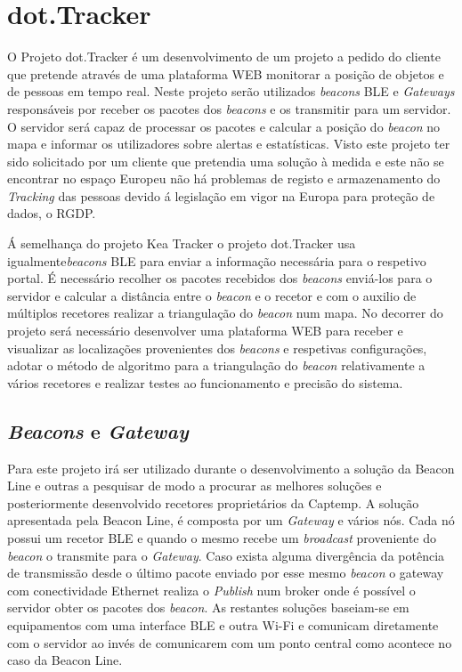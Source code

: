 \section{dot.Tracker} \label{dot.tracker}


\par O Projeto dot.Tracker é um desenvolvimento de um projeto a pedido do cliente que pretende através de uma plataforma WEB monitorar a posição de objetos e de pessoas em tempo real. Neste projeto serão utilizados \textit{beacons} BLE e \textit{Gateways} responsáveis por receber os pacotes dos \textit{beacons} e os transmitir para um servidor. O servidor será capaz de processar os pacotes e calcular a posição do \textit{beacon} no mapa e informar os utilizadores sobre alertas e estatísticas. Visto este projeto ter sido solicitado por um cliente que pretendia uma solução à medida e este não se encontrar no espaço Europeu não há problemas de registo e armazenamento do \textit{Tracking} das pessoas devido á legislação em vigor na Europa para proteção de dados, o RGDP.

Á semelhança do projeto Kea Tracker o projeto dot.Tracker usa igualmente\textit{beacons} BLE para enviar a informação necessária para o respetivo portal. É necessário recolher os pacotes recebidos dos \textit{beacons} enviá-los para o servidor e calcular a distância entre o \textit{beacon} e o recetor e com o auxilio de múltiplos recetores realizar a triangulação do \textit{beacon} num mapa. No decorrer do projeto será necessário desenvolver uma plataforma WEB para receber e visualizar as localizações provenientes dos \textit{beacons} e respetivas configurações, adotar o método de algoritmo para a triangulação do \textit{beacon} relativamente a vários recetores e realizar testes ao funcionamento e precisão do sistema.
\subsection{\textit{Beacons} e \textit{Gateway}}
Para este projeto irá ser utilizado durante o desenvolvimento a solução da Beacon Line\cite{taskit} e outras a pesquisar de modo a procurar as melhores soluções e posteriormente desenvolvido recetores proprietários da Captemp. A solução apresentada pela Beacon Line, é composta por um \textit{Gateway} e vários nós. Cada nó possui um recetor BLE e quando o mesmo recebe um \textit{broadcast} proveniente do \textit{beacon} o transmite para o \textit{Gateway}. Caso exista alguma divergência da potência de transmissão desde o último pacote enviado por esse mesmo \textit{beacon} o gateway com conectividade Ethernet realiza o \textit{Publish} num broker onde é possível o servidor obter os pacotes dos \textit{beacon}. As restantes soluções baseiam-se em equipamentos com uma interface BLE e outra Wi-Fi e comunicam diretamente com o servidor ao invés de comunicarem com um ponto central como acontece no caso da Beacon Line.



